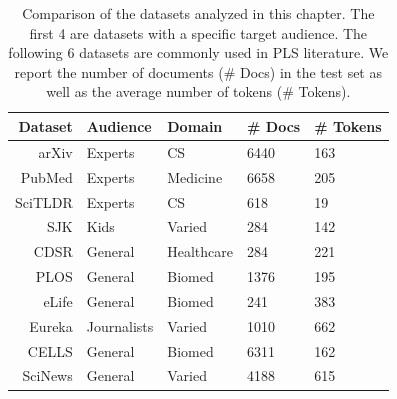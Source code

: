 \begin{table}[t]
\setlength{\tabcolsep}{3pt}
\centering \footnotesize
\begin{tabular}{r|lll l}
\textbf{Dataset} & \textbf{Audience} & \textbf{Domain} & \textbf{\# Docs} & \textbf{\# Tokens} \\ \hline
arXiv & Experts & CS &6440 & 163 \\
PubMed & Experts & Medicine &6658 & 205 \\
SciTLDR & Experts & CS &618 & 19 \\
SJK & Kids & Varied & 284  & 142 \\ \hdashline[0.5pt/3pt]
CDSR & General & Healthcare &284 & 221 \\
PLOS & General & Biomed &1376 & 195 \\
eLife & General & Biomed &241 & 383 \\
Eureka & Journalists & Varied &1010 & 662 \\
CELLS & General & Biomed &6311 & 162 \\
SciNews & General &  Varied & 4188 & 615 
\end{tabular}
\caption[Comparison of the datasets analyzed in this chapter.]{Comparison of the datasets analyzed in this chapter. The first 4 are datasets with a specific target audience. The following 6 datasets are commonly used in PLS literature. We report the number of documents (\# Docs) in the test set as well as the average number of tokens (\# Tokens).
}\label{tab:dataset-comp}
\end{table}